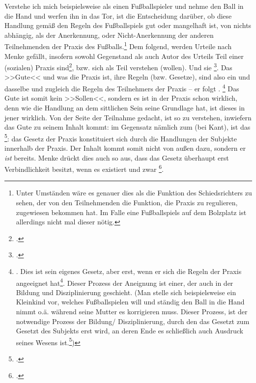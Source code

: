 \documentclass[12pt, a4paper, openany]{report}
\begin{document}
Verstehe ich mich beispielsweise als einen Fußballspieler und nehme den Ball in die Hand und werfen ihn in das Tor, ist die Entscheidung darüber, ob diese Handlung gemäß den Regeln des Fußballspiels gut oder mangelhaft ist, von nichts abhängig, als der Anerkennung, oder Nicht-Anerkennung der anderen Teilnehmenden der Praxis des Fußballs.\footnote{
    Unter Umständen wäre es genauer dies als die Funktion des Schiedsrichters zu sehen, der von den Teilnehmenden die Funktion, die Praxis zu regulieren, zugewiesen bekommen hat. 
    Im Falle eine Fußballspiels auf dem Bolzplatz ist allerdings nicht mal dieser nötig.
}
Dem folgend, werden Urteile nach Menke gefällt, insofern sowohl Gegenstand als auch Autor des Urteils Teil einer (sozialen) Praxis sind\footcite[Vgl.][28]{menke_autonomie_2018}, bzw. sich als Teil verstehen (wollen). 
Und sie \footcite[][S. 28 - S. 29]{menke_autonomie_2018}.
Das >>Gute<< und was die Praxis ist, ihre Regeln (bzw. Gesetze), sind also ein und dasselbe und zugleich die Regeln des Teilnehmers der Praxis -- er folgt .%
\footnote{
    \cite[][29]{menke_autonomie_2018}.
    Dies ist sein eigenes Gesetz, aber erst, wenn er sich die Regeln der Praxis angeeignet hat\footcite[Vgl.][32]{menke_autonomie_2018}.
    Dieser Prozess der Aneignung ist einer, der auch in der Bildung und Disziplinierung geschieht.
    (Man stelle sich beispielsweise ein Kleinkind vor, welches Fußballspielen will und ständig den Ball in die Hand nimmt o.ä. während seine Mutter es korrigieren muss. 
    Dieser Prozess, ist der notwendige Prozess der Bildung/ Disziplinierung, durch den das Gesetzt zum Gesetzt des Subjekts erst wird, an deren Ende es schließlich auch Ausdruck seines Wesens ist.\footcite[Vgl.][§ 147, S. 162]{hegel_grundlinien_2017})
}
Das Gute ist somit kein >>Sollen<<, sondern es ist in der Praxis schon wirklich, denn wie die Handlung an dem sittlichen Sein seine Grundlage hat, ist dieses in jener wirklich.
Von der Seite der Teilnahme gedacht, ist so zu verstehen, inwiefern das Gute zu seinem Inhalt kommt: 
im Gegensatz nämlich zum  (bei Kant), ist das \footcite[][§ 144, S. 161.]{hegel_grundlinien_2017}:
das Gesetz der Praxis konstituiert sich durch die Handlungen der Subjekte innerhalb der Praxis.
Der Inhalt kommt somit nicht von außen dazu, sondern er \emph{ist} bereits.
Menke drückt dies auch so aus, dass das Gesetz überhaupt erst Verbindlichkeit besitzt, wenn es existiert und zwar \footcite[][57]{menke_autonomie_2018}.
\end{document}
